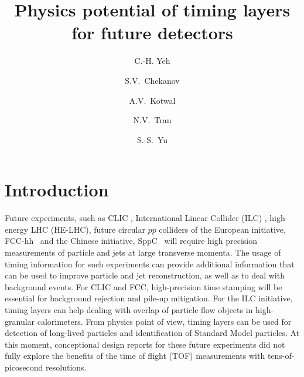 \documentclass[final,1p,11pt]{elsarticle}
\begin{document}
\begin{frontmatter}

\title{
Physics potential of timing layers for future detectors}

\author[add3]{C.-H. Yeh}

\author[add1]{S.V.~Chekanov}

\author[addDuke]{A.V.~Kotwal}

\author[add2]{N.V.~Tran}

\author[add3]{S.-S.~Yu}

\address[add3]{
Department of Physics and Center for High Energy and High Field Physics, 
National Central University, Chung-Li, Taoyuan City 32001, Taiwan
}

\address[add1]{
HEP Division, Argonne National Laboratory,
9700 S.~Cass Avenue,
Argonne, IL 60439, USA. 
}

\address[addDuke]{
Department of Physics, Duke University, USA
}

\address[add2]{
Fermi National Accelerator Laboratory
}




\begin{abstract}

\end{abstract}

\begin{keyword}

\end{keyword}
\end{frontmatter}



\section{Introduction}

Future experiments, such as CLIC \cite{Linssen:1425915}, International Linear Collider (ILC) \cite{Behnke:2013xla}, high-energy LHC (HE-LHC),
future circular $pp$ colliders of the European initiative, FCC-hh~\cite{Benedikt:2206376} and the Chinese initiative, SppC~\cite{Tang:2015qga} will require high precision measurements of particle and jets 
at large transverse momenta. 
The usage of timing information for such experiments  can  provide additional 
information that can be used to improve particle and jet reconstruction, as well as to deal with background events.
For CLIC and FCC, high-precision time stamping will be essential for
background rejection and pile-up mitigation.
For the ILC initiative, timing layers can help dealing with overlap of particle flow objects in high-granular calorimeters.
From physics point of view, timing layers can be used for detection of long-lived particles and identification of Standard Model particles. 
At this moment, conceptional design reports for these future experiments did not fully explore
the benefits of the time of flight (TOF) measurements with tens-of-picosecond resolutions.
\end{document}
